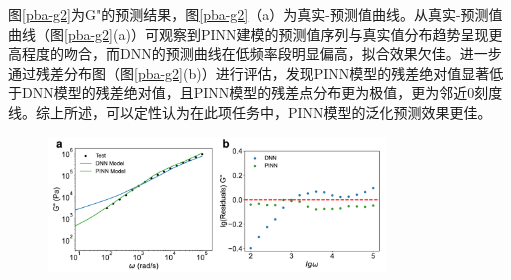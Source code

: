 图\ref{pba-g2}为G"的预测结果，图\ref{pba-g2}（a）为真实-预测值曲线。从真实-预测值曲线（图\ref{pba-g2}(a)）可观察到PINN建模的预测值序列与真实值分布趋势呈现更高程度的吻合，而DNN的预测曲线在低频率段明显偏高，拟合效果欠佳。进一步通过残差分布图（图\ref{pba-g2}(b)）进行评估，发现PINN模型的残差绝对值显著低于DNN模型的残差绝对值，且PINN模型的残差点分布更为极值，更为邻近0刻度线。综上所述，可以定性认为在此项任务中，PINN模型的泛化预测效果更佳。
\begin{figure}[htbp]
  \centering
  \includegraphics[width=0.8\textwidth]{Fig/pba-g2.pdf}
\end{figure}

